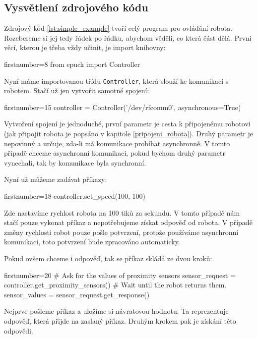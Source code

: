 \subsection{Vysvětlení zdrojového kódu}

    Zdrojový kód \ref{lst:simple_example} tvoří celý program pro ovládání
    robota. Rozebereme si jej tedy řádek po řádku, abychom věděli, co která
    část dělá. První věcí, kterou je třeba vždy učinit, je import knihovny:

    \begin{pyc*}{firstnumber=8}
from epuck import Controller
    \end{pyc*}

    Nyní máme importovanou třídu {\tt Controller}, která slouží ke komunikaci s
    robotem. Stačí už jen vytvořit samotné spojení:

    \begin{pyc*}{firstnumber=15}
controller = Controller('/dev/rfcomm0', asynchronous=True)
    \end{pyc*}

    Vytvoření spojení je jednoduché, první parametr je cesta k připojenému
    robotovi (jak připojit robota je popsáno v kapitole
    \ref{pripojeni_robota}). Druhý parametr je nepovinný a určuje, zda-li má
    komunikace probíhat asynchronně. V tomto případě chceme asynchronní
    komunikaci, pokud bychom druhý parametr vynechali, tak by komunikace byla
    synchronní.

    Nyní už můžeme zadávat příkazy:

    \begin{pyc*}{firstnumber=18}
controller.set_speed(100, 100)
    \end{pyc*}

    Zde nastavíme rychlost robota na 100 tiků za sekundu. V tomto případě nám
    stačí pouze vykonat příkaz a nepotřebujeme získat odpověď od robota. V
    případě změny rychlosti robot pouze pošle potvrzení, protože používáme
    asynchronní komunikaci, toto potvrzení bude zpracováno automaticky.

    Pokud ovšem chceme i odpověď, tak se příkaz skládá ze dvou kroků:

    \begin{pyc*}{firstnumber=20}
# Ask for the values of proximity sensors
sensor_request = controller.get_proximity_sensors()
# Wait until the robot returns them.
sensor_values = sensor_request.get_response()
    \end{pyc*}

    Nejprve pošleme příkaz a uložíme si návratovou hodnotu. Ta reprezentuje
    odpověď, která přijde na zaslaný příkaz. Druhým krokem pak je získání této
    odpovědi.

